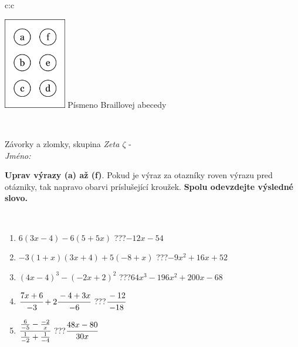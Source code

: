 \documentclass[10pt]{report}
\begin{document}
\begin{tabular}{c:c}
\begin{minipage}[c][104.5mm][t]{0.5\linewidth}
\begin{center}
\begin{minipage}{0.20\linewidth}
\begin{center}
\includegraphics[height=40mm]{../images/braille.png}
{\small Písmeno Braillovej abecedy}
\end{center}
\end{minipage}
\end{center}
\end{minipage}
\\ \hdashline
\begin{minipage}[c][104.5mm][t]{0.5\linewidth}
\begin{center}
\vspace{7mm}
{\huge Závorky a zlomky, skupina \textit{Zeta $\zeta$} -}\\[5mm]
\textit{Jméno:}\phantom{xxxxxxxxxxxxxxxxxxxxxxxxxxxxxxxxxxxxxxxxxxxxxxxxxxxxxxxxxxxxxxxxx}\\[5mm]
\begin{minipage}{0.95\linewidth}
\begin{center}
\textbf{Uprav výrazy (a) až (f)}. Pokud je výraz za otazníky roven výrazu pred otázniky, tak napravo obarvi príslušející kroužek. \textbf{Spolu odevzdejte výsledné slovo.}
\end{center}
\end{minipage}
\\[1mm]
\begin{minipage}{0.79\linewidth}
\begin{center}
\begin{varwidth}{\linewidth}
\begin{enumerate}
\normalsize
\item $6(3x-4)-6(5+5x)$\quad \dotfill\; ???\;\dotfill \quad $-12x-54$
\item $-3(1+x)(3x+4)+5(-8+x)$\quad \dotfill\; ???\;\dotfill \quad $-9x^2+16x+52$
\item $(4x-4)^3-(-2x+2)^2$\quad \dotfill\; ???\;\dotfill \quad $64x^3-196x^2+200x-68$
\item $\cfrac{7x+6}{-3}+2\cfrac{-4+3x}{-6}$\quad \dotfill\; ???\;\dotfill \quad $\cfrac{-12}{-18}$
\item $\cfrac{\frac{6}{-5}-\frac{-2}{x}}{\frac{1}{-2}+\frac{1}{-4}}$\quad \dotfill\; ???\;\dotfill \quad $\cfrac{48x-80}{30x}$

\end{enumerate}
\end{varwidth}
\end{center}
\end{minipage}
\end{center}
\end{minipage}
\end{tabular}
\end{document}
